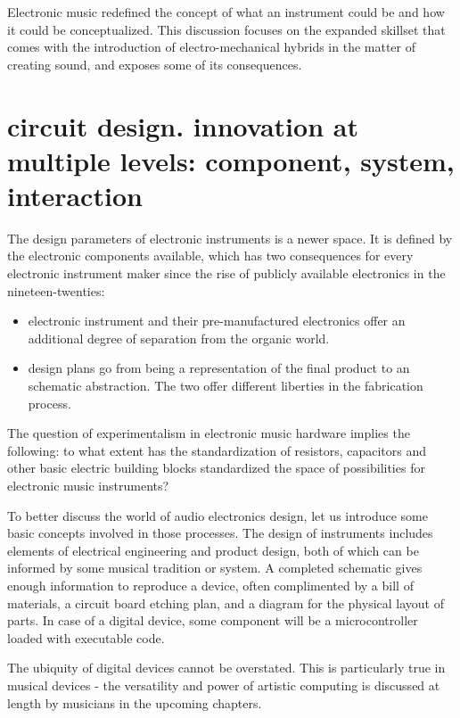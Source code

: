 	Electronic music redefined the concept of what an instrument could be and how it could be conceptualized. This discussion focuses on the expanded skillset that comes with the introduction of electro-mechanical hybrids in the matter of creating sound, and exposes some of its consequences. 

\section{circuit design. innovation at multiple levels: component, system, interaction}

The design parameters of electronic instruments is a newer space. It is defined by the electronic components available, which has two consequences for every electronic instrument maker since the rise of publicly available electronics in the nineteen-twenties:

\begin{itemize}
	\item electronic instrument and their pre-manufactured electronics offer an additional degree of separation from the organic world. 
	\item design plans go from being a representation of the final product to an schematic abstraction. The two offer different liberties in the fabrication process.
\end{itemize}
	
The question of experimentalism in electronic music hardware implies the following: to what extent has the standardization of resistors, capacitors and other basic electric building blocks standardized the space of possibilities for electronic music instruments? 

To better discuss the world of audio electronics design, let us introduce some basic concepts involved in those processes. The design of instruments includes elements of electrical engineering and product design, both of which can be informed by some musical tradition or system. A completed schematic gives enough information to reproduce a device, often complimented by a bill of materials, a circuit board etching plan, and a diagram for the physical layout of parts. In case of a digital device, some component will be a microcontroller loaded with executable code. 

The ubiquity of digital devices cannot be overstated. This is particularly true in musical devices - the versatility and power of artistic computing is discussed at length by musicians in the upcoming chapters. 

